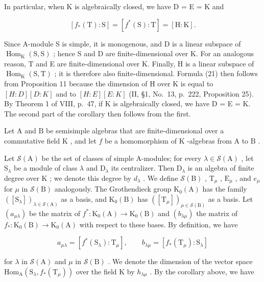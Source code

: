 In particular, when K is algebraically closed, we have D = E = K and

\[
[ f _ {*} (\mathrm{T}): \mathrm{S} ] = [ f ^ {*} (\mathrm{S}): \mathrm{T} ] = [ \mathrm{H}: \mathrm{K} ].\tag{22}
\]

Since A-module S is simple, it is monogenous, and D is a linear subspace of \(\operatorname{Hom}_{\mathrm{K}}(\mathrm{S},\mathrm{S})\) ; hence S and D are finite-dimensional over K. For an analogous reason, T and E are finite-dimensional over K. Finally, H is a linear subspace of \(\operatorname{Hom}_{\mathrm{K}}(\mathrm{S},\mathrm{T})\) ; it is therefore also finite-dimensional. Formula (21) then follows from Proposition 11 because the dimension of H over K is equal to \([H:D][D:K]\) and to \([H:E][E:K]\) (II, §1, No.~13, p.~222, Proposition 25). By Theorem 1 of VIII, p.~47, if K is algebraically closed, we have D = E = K. The second part of the corollary then follows from the first.

Let \(\mathrm{A}\) and \(\mathrm{B}\) be semisimple algebras that are finite-dimensional over a commutative field \(\mathrm{K}\) , and let \(f\) be a homomorphism of \(\mathrm{K}\) -algebras from \(\mathrm{A}\) to \(\mathrm{B}\) .

Let \(\mathcal{S}(\mathrm{A})\) be the set of classes of simple A-modules; for every \(\lambda \in \mathcal{S}(\mathrm{A})\) , let \(\mathrm{S}_{\lambda}\) be a module of class \(\lambda\) and \(\mathrm{D}_{\lambda}\) its centralizer. Then \(\mathrm{D}_{\lambda}\) is an algebra of finite degree over \(\mathrm{K}\) ; we denote this degree by \(d_{\lambda}\) . We define \(\mathcal{S}(\mathrm{B})\) , \(\mathrm{T}_{\mu}\) , \(\mathrm{E}_{\mu}\) , and \(e_{\mu}\) for \(\mu\) in \(\mathcal{S}(\mathrm{B})\) analogously. The Grothendieck group \(\mathrm{K}_0(\mathrm{A})\) has the family \(([\mathrm{S}_{\lambda}])_{\lambda \in \mathcal{S}(\mathrm{A})}\) as a basis, and \(\mathrm{K}_0(\mathrm{B})\) has \(([\mathrm{T}_{\mu}])_{\mu \in \mathcal{S}(\mathrm{B})}\) as a basis. Let \((a_{\mu \lambda})\) be the matrix of \(f^{*}: \mathrm{K}_{0}(\mathrm{A}) \to \mathrm{K}_{0}(\mathrm{B})\) and \((b_{\lambda \mu})\) the matrix of \(f_{*}: \mathrm{K}_{0}(\mathrm{B}) \to \mathrm{K}_{0}(\mathrm{A})\) with respect to these bases. By definition, we have

\[
a _ {\mu \lambda} = [ f ^ {*} (\mathrm{S} _ {\lambda}): \mathrm{T} _ {\mu} ], \qquad b _ {\lambda \mu} = [ f _ {*} (\mathrm{T} _ {\mu}): \mathrm{S} _ {\lambda} ]\tag{23}
\]

for \(\lambda\) in \(\mathcal{S}(\mathrm{A})\) and \(\mu\) in \(\mathcal{S}(\mathrm{B})\) . We denote the dimension of the vector space \(\mathrm{Hom}_{\mathrm{A}}(\mathrm{S}_{\lambda}, f_{*}(\mathrm{T}_{\mu}))\) over the field K by \(h_{\lambda \mu}\) . By the corollary above, we have

